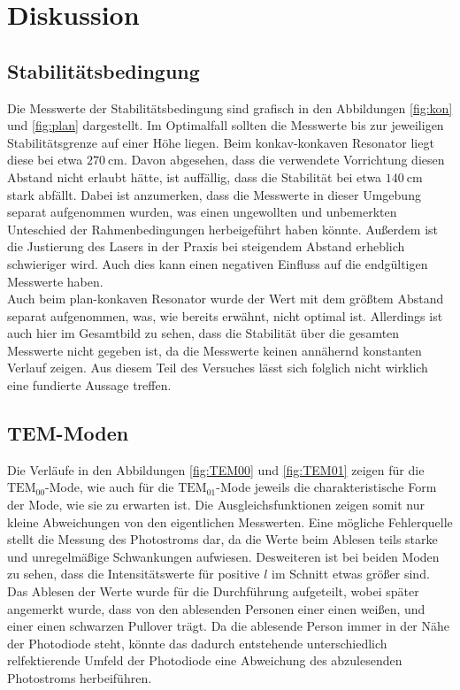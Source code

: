 \section{Diskussion}
\label{sec:Diskussion}

\subsection{Stabilitätsbedingung}

Die Messwerte der Stabilitätsbedingung sind grafisch in den Abbildungen \ref{fig:kon} und \ref{fig:plan} dargestellt. Im Optimalfall sollten die 
Messwerte bis zur jeweiligen Stabilitätsgrenze auf einer Höhe liegen. Beim konkav-konkaven Resonator liegt diese bei etwa $\SI{270}{\centi\metre}$.
Davon abgesehen, dass die verwendete Vorrichtung diesen Abstand nicht erlaubt hätte, ist auffällig, dass die Stabilität bei etwa $\SI{140}{\centi\metre}$
stark abfällt. Dabei ist anzumerken, dass die Messwerte in dieser Umgebung separat aufgenommen wurden, was einen ungewollten und unbemerkten 
Unteschied der Rahmenbedingungen herbeigeführt haben könnte. Außerdem ist die Justierung des Lasers in der Praxis bei steigendem Abstand erheblich schwieriger 
wird. Auch dies kann einen negativen Einfluss auf die endgültigen Messwerte haben. \\
Auch beim plan-konkaven Resonator wurde der Wert mit dem größtem Abstand separat aufgenommen, was, wie bereits erwähnt, nicht optimal ist. Allerdings
ist auch hier im Gesamtbild zu sehen, dass die Stabilität über die gesamten Messwerte nicht gegeben ist, da die Messwerte keinen annähernd 
konstanten Verlauf zeigen. Aus diesem Teil des Versuches lässt sich folglich nicht wirklich eine fundierte Aussage treffen. 

\subsection{TEM-Moden}

Die Verläufe in den Abbildungen \ref{fig:TEM00} und \ref{fig:TEM01} zeigen für die $\text{TEM}_{00}$-Mode, wie auch für die $\text{TEM}_{01}$-Mode jeweils
die charakteristische Form der Mode, wie sie zu erwarten ist. Die Ausgleichsfunktionen zeigen somit nur kleine Abweichungen von den 
eigentlichen Messwerten. Eine mögliche Fehlerquelle stellt die Messung des Photostroms dar, da die Werte beim Ablesen teils starke und 
unregelmäßige Schwankungen aufwiesen. Desweiteren ist bei beiden Moden zu sehen, dass die Intensitätswerte für positive $l$ im Schnitt etwas 
größer sind. Das Ablesen der Werte wurde für die Durchführung aufgeteilt, wobei später angemerkt wurde, dass von den ablesenden Personen 
einer einen weißen, und einer einen schwarzen Pullover trägt. Da die ablesende Person immer in der Nähe der Photodiode steht, könnte das dadurch
entstehende unterschiedlich relfektierende Umfeld der Photodiode eine Abweichung des abzulesenden Photostroms herbeiführen. 

